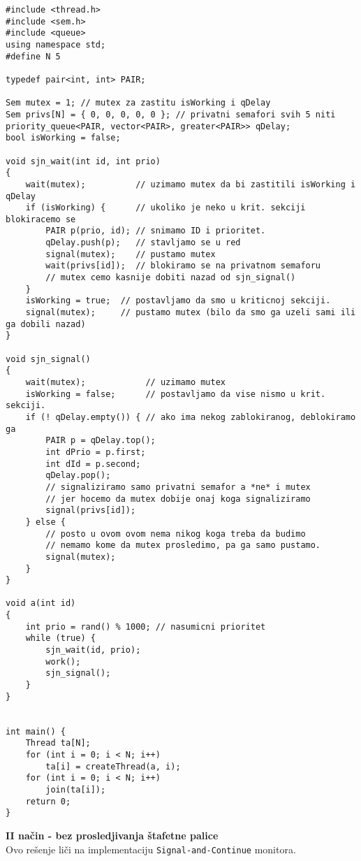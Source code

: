 \begin{lstlisting}
#include <thread.h>
#include <sem.h>
#include <queue>
using namespace std;
#define N 5

typedef pair<int, int> PAIR;

Sem mutex = 1; // mutex za zastitu isWorking i qDelay
Sem privs[N] = { 0, 0, 0, 0, 0 }; // privatni semafori svih 5 niti
priority_queue<PAIR, vector<PAIR>, greater<PAIR>> qDelay;
bool isWorking = false;

void sjn_wait(int id, int prio)
{
    wait(mutex);          // uzimamo mutex da bi zastitili isWorking i qDelay
    if (isWorking) {      // ukoliko je neko u krit. sekciji blokiracemo se
        PAIR p(prio, id); // snimamo ID i prioritet.
        qDelay.push(p);   // stavljamo se u red
        signal(mutex);    // pustamo mutex
        wait(privs[id]);  // blokiramo se na privatnom semaforu
        // mutex cemo kasnije dobiti nazad od sjn_signal()
    } 
    isWorking = true;  // postavljamo da smo u kriticnoj sekciji.
    signal(mutex);     // pustamo mutex (bilo da smo ga uzeli sami ili ga dobili nazad)
}

void sjn_signal() 
{
    wait(mutex);            // uzimamo mutex
    isWorking = false;      // postavljamo da vise nismo u krit. sekciji.  
    if (! qDelay.empty()) { // ako ima nekog zablokiranog, deblokiramo ga
        PAIR p = qDelay.top();
        int dPrio = p.first;
        int dId = p.second;
        qDelay.pop();
        // signaliziramo samo privatni semafor a *ne* i mutex
        // jer hocemo da mutex dobije onaj koga signaliziramo
        signal(privs[id]);
    } else {
        // posto u ovom ovom nema nikog koga treba da budimo
        // nemamo kome da mutex prosledimo, pa ga samo pustamo.
        signal(mutex); 
    }
}

void a(int id) 
{
    int prio = rand() % 1000; // nasumicni prioritet
    while (true) {
        sjn_wait(id, prio);
        work();
        sjn_signal();
    }
}


int main() {
    Thread ta[N];
    for (int i = 0; i < N; i++)
        ta[i] = createThread(a, i);
    for (int i = 0; i < N; i++)
		join(ta[i]);
    return 0;
}

\end{lstlisting}
\textbf{\large II na\v{c}in - bez prosledjivanja \v{s}tafetne palice} \\
Ovo re\v{s}enje li\v{c}i na implementaciju \texttt{Signal-and-Continue} monitora.
